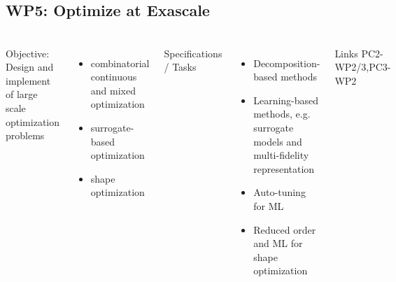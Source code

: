 \subsection{WP5: Optimize at Exascale }
\begin{frame}
  \frametitle{\insertsectionhead}
  \framesubtitle{\insertsubsectionhead}
  \begin{columns}
    Objective: Design and implement of large scale optimization problems
    \begin{itemize}
      \item combinatorial continuous and mixed optimization
      \item surrogate-based optimization
      \item shape optimization 
    \end{itemize}
    Specifications / Tasks
    \begin{itemize}
      \item Decomposition-based methods
      \item Learning-based methods, e.g. surrogate models and multi-fidelity representation
      \item Auto-tuning for ML
      \item Reduced order and ML for shape optimization 
    \end{itemize}
    \begin{alertblock}{Links}
      PC2-WP2/3,PC3-WP2 
    \end{alertblock}
  \end{columns}
\end{frame}

